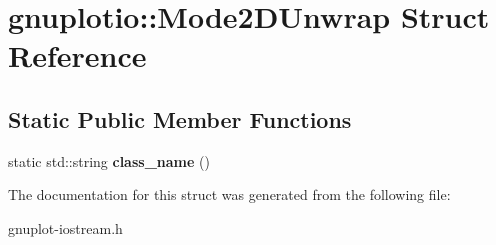 \hypertarget{structgnuplotio_1_1Mode2DUnwrap}{}\section{gnuplotio\+:\+:Mode2\+D\+Unwrap Struct Reference}
\label{structgnuplotio_1_1Mode2DUnwrap}
\subsection*{Static Public Member Functions}
\begin{DoxyCompactItemize}
\item 
\mbox{\label{structgnuplotio_1_1Mode2DUnwrap_ab2f533c9ceb52cfecaa161c64316deb9}} 
static std\+::string {\bfseries class\+\_\+name} ()
\end{DoxyCompactItemize}


The documentation for this struct was generated from the following file\+:\begin{DoxyCompactItemize}
\item 
gnuplot-\/iostream.\+h\end{DoxyCompactItemize}
